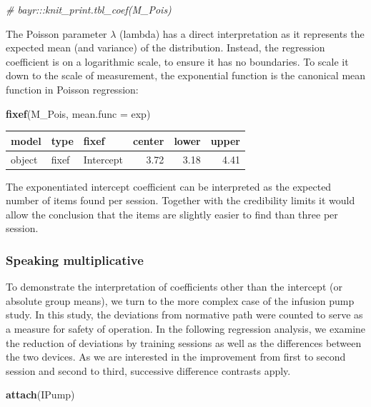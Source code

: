 \documentclass[]{svmono}
\newenvironment{Shaded}{\begin{snugshade}}{\end{snugshade}}
\newcommand{\KeywordTok}[1]{\textcolor[rgb]{0.13,0.29,0.53}{\textbf{#1}}}
\newcommand{\DataTypeTok}[1]{\textcolor[rgb]{0.13,0.29,0.53}{#1}}
\newcommand{\CommentTok}[1]{\textcolor[rgb]{0.56,0.35,0.01}{\textit{#1}}}
\newcommand{\NormalTok}[1]{#1}
\theoremstyle{definition}
\theoremstyle{definition}
\theoremstyle{definition}
\theoremstyle{remark}
\begin{document}
\begin{Shaded}
\begin{Highlighting}[]
\CommentTok{# bayr:::knit_print.tbl_coef(M_Pois)}
\end{Highlighting}
\end{Shaded}

The Poisson parameter \(\lambda\) (lambda) has a direct interpretation
as it represents the expected mean (and variance) of the distribution.
Instead, the regression coefficient is on a logarithmic scale, to ensure
it has no boundaries. To scale it down to the scale of measurement, the
exponential function is the canonical mean function in Poisson
regression:

\begin{Shaded}
\begin{Highlighting}[]
\KeywordTok{fixef}\NormalTok{(M_Pois, }\DataTypeTok{mean.func =}\NormalTok{ exp)}
\end{Highlighting}
\end{Shaded}

\begin{longtable}[]{@{}lllrrr@{}}
\toprule
model & type & fixef & center & lower & upper\tabularnewline
\midrule
\endhead
object & fixef & Intercept & 3.72 & 3.18 & 4.41\tabularnewline
\bottomrule
\end{longtable}

The exponentiated intercept coefficient can be interpreted as the
expected number of items found per session. Together with the
credibility limits it would allow the conclusion that the items are
slightly easier to find than three per session.

\subsubsection{Speaking multiplicative}\label{speaking-multiplicative}

To demonstrate the interpretation of coefficients other than the
intercept (or absolute group means), we turn to the more complex case of
the infusion pump study. In this study, the deviations from normative
path were counted to serve as a measure for safety of operation. In the
following regression analysis, we examine the reduction of deviations by
training sessions as well as the differences between the two devices. As
we are interested in the improvement from first to second session and
second to third, successive difference contrasts apply.

\begin{Shaded}
\begin{Highlighting}[]
\KeywordTok{attach}\NormalTok{(IPump)}
\end{Highlighting}
\end{Shaded}
\end{document}

